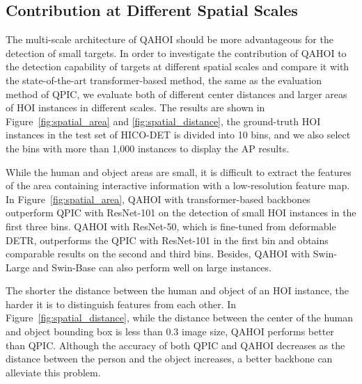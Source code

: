 \documentclass[10pt,twocolumn,letterpaper]{article}
\begin{document}
\subsection{Contribution at Different Spatial Scales}
The multi-scale architecture of QAHOI should be more advantageous for the detection of small targets. 
In order to investigate the contribution of QAHOI to the detection capability of targets at different spatial scales and compare it with the state-of-the-art transformer-based method, the same as the evaluation method of QPIC, we evaluate both of different center distances and larger areas of HOI instances in different scales.
The results are shown in Figure~\ref{fig:spatial_area} and \ref{fig:spatial_distance}, the ground-truth HOI instances in the test set of HICO-DET is divided into 10 bins, and we also select the bins with more than 1,000 instances to display the AP results.

While the human and object areas are small, it is difficult to extract the features of the area containing interactive information with a low-resolution feature map.
In Figure~\ref{fig:spatial_area}, QAHOI with transformer-based backbones outperform QPIC with ResNet-101 on the detection of small HOI instances in the first three bins. 
QAHOI with ResNet-50, which is fine-tuned from deformable DETR, outperforms the QPIC with ResNet-101 in the first bin and obtains comparable results on the second and third bins.
Besides, QAHOI with Swin-Large and Swin-Base can also perform well on large instances.

The shorter the distance between the human and object of an HOI instance, the harder it is to distinguish features from each other.
In Figure~\ref{fig:spatial_distance}, while the distance between the center of the human and object bounding box is less than 0.3 image size, QAHOI performs better than QPIC. 
Although the accuracy of both QPIC and QAHOI decreases as the distance between the person and the object increases, a better backbone can alleviate this problem.
\end{document}
